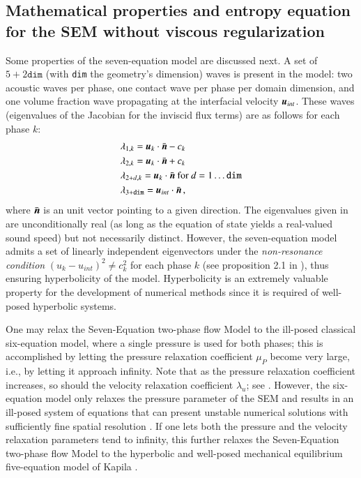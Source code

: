 \subsection{Mathematical properties and entropy equation for the SEM without viscous regularization}\label{eq:sem-ent-wv}
Some properties of the seven-equation model are discussed next. A set of $5+2\texttt{dim}$ (with \texttt{dim} the geometry's dimension) waves 
is present in the model: two acoustic waves per phase, one contact wave per phase per domain dimension, and one volume fraction wave propagating 
at the interfacial velocity $\boldsymbol u_{int}$. These waves (eigenvalues of the Jacobian for the inviscid flux terms) are as follows for each phase $k$:
% 
\begin{align}\label{eq:eigenvalues}
&\lambda_{1,k} = \boldsymbol u_k \cdot \bar{\boldsymbol n} - c_k \nonumber\\
&\lambda_{2,k} = \boldsymbol u_k \cdot \bar{\boldsymbol n} + c_k \nonumber\\
&\lambda_{2+d,k} = \boldsymbol u_k \cdot \bar{\boldsymbol n} \text{ for } d = 1 \dots \texttt{dim} \\
&\lambda_{3+\texttt{dim}} = \boldsymbol u_{int} \cdot \bar{\boldsymbol n} \nonumber \,,
\end{align}
%
where $\bar{\boldsymbol n}$ is an unit vector pointing to a given direction. The eigenvalues given in  are unconditionally 
real (as long as the equation of state yields a real-valued sound speed) but not necessarily distinct. However, the seven-equation model admits 
a set of linearly independent eigenvectors under the \emph{non-resonance condition} $(u_k-u_{int})^2 \neq c_k^2$ for each phase $k$ 
(see proposition 2.1 in \cite{coquel_herard}), thus ensuring hyperbolicity of the model.
Hyperbolicity is an extremely valuable property for the development of numerical methods since it is required of well-posed hyperbolic systems.

One may relax the Seven-Equation two-phase flow Model to
the ill-posed classical six-equation model, where a single pressure 
is used for both phases; this is
accomplished by letting the pressure relaxation coefficient $\mu_P$ become
very large, i.e., by letting it approach infinity.  Note that as the pressure
relaxation coefficient increases, so should the velocity
relaxation coefficient $\lambda_u$; see . 
However, the six-equation model only relaxes the pressure parameter of the SEM and results
in an ill-posed system of equations that can present unstable numerical solutions
with sufficiently fine spatial resolution \cite{SEM,Herrard_2005}. 
%
If one lets both the pressure and the velocity relaxation parameters tend to infinity, this further relaxes the
Seven-Equation two-phase flow Model to the hyperbolic and well-posed 
mechanical equilibrium five-equation model of Kapila \cite{Kapila_2001}.  

